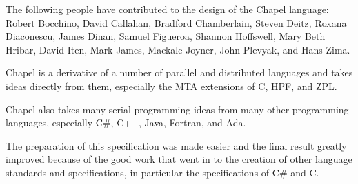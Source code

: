 \label{Acknowledgments}

The following people have contributed to the design of the Chapel
language:
Robert Bocchino,
David Callahan,
Bradford Chamberlain,
Steven Deitz,
Roxana Diaconescu,
James Dinan,
Samuel Figueroa,
Shannon Hoffswell,
Mary Beth Hribar,
David Iten,
Mark James,
Mackale Joyner,
John Plevyak,
and Hans Zima.

Chapel is a derivative of a number of parallel and distributed
languages and takes ideas directly from them, especially the MTA
extensions of C, HPF, and ZPL.

Chapel also takes many serial programming ideas from many other
programming languages, especially C\#, C++, Java, Fortran, and Ada.

The preparation of this specification was made easier and the final
result greatly improved because of the good work that went in to the
creation of other language standards and specifications, in particular
the specifications of C\# and C.
